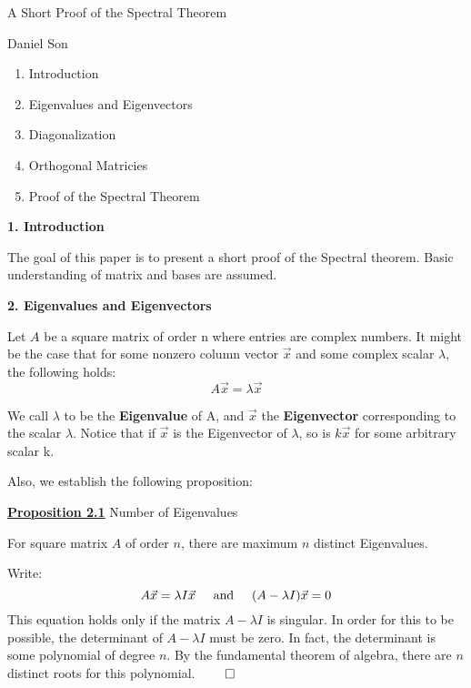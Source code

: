 \documentclass{article}
\newcommand{\new}[1]{
    \vspace{2mm}
    \noindent
    \textbf{
    \underline{#1}}
}
\newcommand{\textAnd}{
    {
        \hspace{5mm}
        \textrm{and}
        \hspace{5mm}
    }
}
\begin{document}
\begin{center}
\LARGE
A Short Proof of the Spectral Theorem

\Large
Daniel Son
\end{center}

\normalsize


\begin{enumerate}
    \item Introduction
    \item Eigenvalues and Eigenvectors
    \item Diagonalization
    \item Orthogonal Matricies
    \item Proof of the Spectral Theorem
\end{enumerate}

\vspace{15mm}

\textbf{1. Introduction}

The goal of this paper is to present a short proof of the Spectral 
theorem. Basic understanding of matrix and bases are assumed. 

\vspace{15mm}

\textbf{2. Eigenvalues and Eigenvectors}

Let $A$ be a square matrix of order n where entries are complex numbers. 
It might be the case that
 for some nonzero column vector $\vec{x}$ and some complex scalar $\lambda$, 
the following holds:
\[
    A \vec{x} = \lambda \vec{x}
\]

We call $\lambda$ to be the \textbf{Eigenvalue} of A, and $\vec{x}$ 
the \textbf{Eigenvector} corresponding to the scalar $\lambda$. 
Notice that if $\vec{x}$ is the Eigenvector of $\lambda$, so is $k\vec{x}$
for some arbitrary scalar k. 

Also, we establish the following proposition:

\new{Proposition 2.1} Number of Eigenvalues

For square matrix $A$ of order $n$, there are maximum $n$ distinct 
Eigenvalues. 

\proof 
Write:
\[
    A\vec{x} = \lambda I \vec{x} 
    \textAnd 
    (A - \lambda I) \vec{x} = 0
\]
This equation holds only if the matrix $A - \lambda I$ is singular. 
In order for this to be possible, the determinant of $A - \lambda I$ 
must be zero. In fact, the determinant is some polynomial of degree $n$. 
By the fundamental theorem of algebra, there are $n$ distinct roots 
for this polynomial. $\qed$
\end{document}
